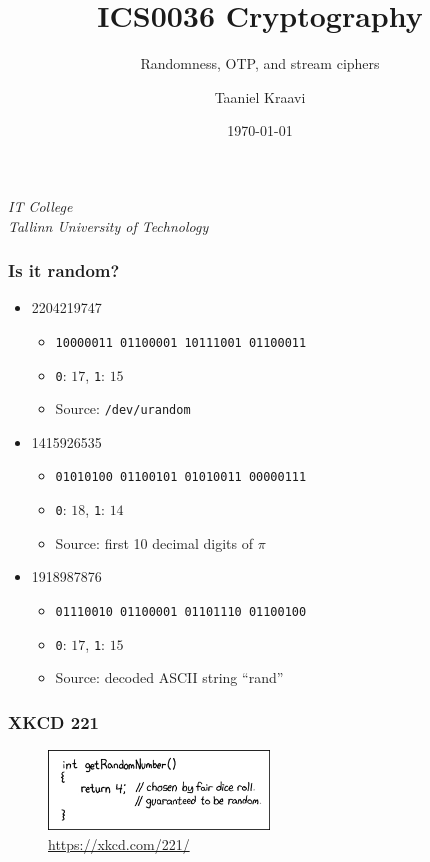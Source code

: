 \graphicspath{ {../../images/} }
\usetikzlibrary{external}
\usepackage{pifont}

\usepackage{crygame}

\title{ICS0036 Cryptography}
\subtitle{Randomness, OTP, and stream ciphers}
\date{\today}
\author{Taaniel Kraavi}
\institute%
{%
  \textit{IT College}\\
  \textit{Tallinn University of Technology}
}


\begin{frame}
  \titlepage
\end{frame}

\begin{frame}
  \frametitle{Is it random?}

  \begin{itemize}
    \item<1-> 2204219747
    \begin{itemize}
      \item<2-> \texttt{10000011 01100001 10111001 01100011}
      \item<2-> \texttt{0}: $17$, \texttt{1}: $15$
      \item<3-> Source: \texttt{/dev/urandom}
    \end{itemize}
    \item<1-> 1415926535
    \begin{itemize}
      \item<2-> \texttt{01010100 01100101 01010011 00000111}
      \item<2-> \texttt{0}: $18$, \texttt{1}: $14$
      \item<4-> Source: first 10 decimal digits of $\pi$
    \end{itemize}
    \item<1-> 1918987876
    \begin{itemize}
      \item<2-> \texttt{01110010 01100001 01101110 01100100}
      \item<2-> \texttt{0}: $17$, \texttt{1}: $15$
      \item<5-> Source: decoded ASCII string \enquote{rand}
    \end{itemize}
  \end{itemize}
\end{frame}

\begin{frame}
  \frametitle{XKCD 221}

  \begin{figure}
    \centering
    \includegraphics[height=80px]{xkcd221.png}
    \caption{\url{https://xkcd.com/221/}}
  \end{figure}
\end{frame}

